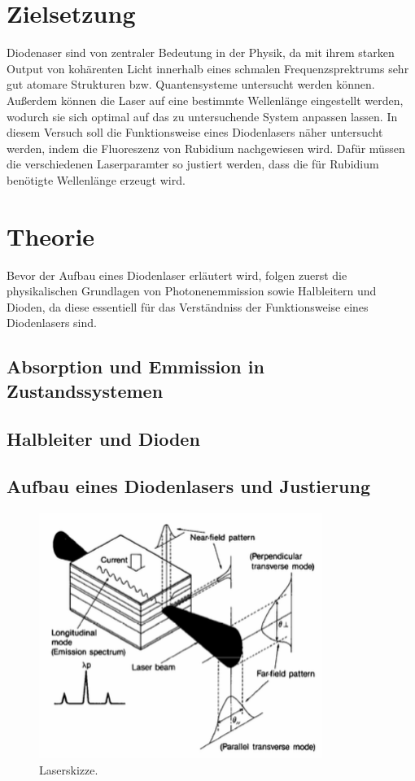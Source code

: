 \section{Zielsetzung}
\label{sec:Zielsetzung}
Diodenaser sind von zentraler Bedeutung in der Physik, da mit ihrem starken Output von kohärenten
Licht innerhalb eines schmalen Frequenzsprektrums sehr gut atomare Strukturen bzw. Quantensysteme
untersucht werden können. Außerdem können die Laser auf eine bestimmte Wellenlänge eingestellt werden, 
wodurch sie sich optimal auf das zu untersuchende System anpassen lassen.
In diesem Versuch soll die Funktionsweise eines Diodenlasers näher untersucht werden, indem die
Fluoreszenz von Rubidium nachgewiesen wird. Dafür müssen die verschiedenen Laserparamter so justiert werden,
dass die für Rubidium benötigte Wellenlänge erzeugt wird.

\section{Theorie}
\label{sec:Theorie}

Bevor der Aufbau eines Diodenlaser erläutert wird, folgen zuerst die physikalischen Grundlagen von Photonenemmission
sowie Halbleitern und Dioden, da diese essentiell für das Verständniss der Funktionsweise eines Diodenlasers sind.

\subsection{Absorption und Emmission in Zustandssystemen}

\subsection{Halbleiter und Dioden}

\subsection{Aufbau eines Diodenlasers und Justierung}

\begin{figure}[H]
    \centering
    \includegraphics[height=8cm]{content/pics/laser.png}
    \caption{Laserskizze. \cite{V60}}
    \label{fig:laser}
\end{figure}


